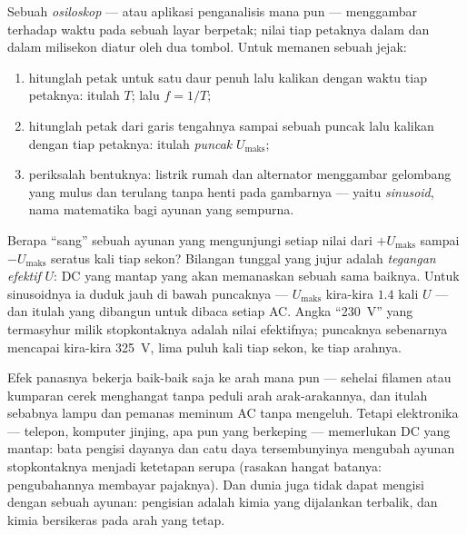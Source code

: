 \begin{method}\label{met:g9:alternating-current:scope}
Sebuah \emph{osiloskop} --- atau aplikasi penganalisis mana
pun --- menggambar  terhadap waktu pada sebuah layar berpetak;
nilai tiap petaknya dalam  dan dalam milisekon diatur oleh dua
tombol. Untuk memanen sebuah jejak:
\begin{enumerate}
  \item hitunglah petak untuk satu daur penuh lalu kalikan dengan
        waktu tiap petaknya: itulah $T$; lalu $f = 1/T$;
  \item hitunglah petak dari garis tengahnya sampai sebuah puncak lalu
        kalikan dengan  tiap petaknya: itulah \emph{
        puncak} $U_{\text{maks}}$;
  \item periksalah bentuknya: listrik rumah dan alternator menggambar
        gelombang yang mulus dan terulang tanpa henti pada gambarnya
        --- yaitu \emph{sinusoid}, nama matematika bagi ayunan yang
        sempurna.
\end{enumerate}
\end{method}

\begin{proposition}\label{prop:g9:alternating-current:effective}
Berapa ``sang''  sebuah ayunan yang mengunjungi setiap nilai
dari $+U_{\text{maks}}$ sampai $-U_{\text{maks}}$ seratus kali tiap
sekon? Bilangan tunggal yang jujur adalah \emph{tegangan
efektif} $U$:  DC yang mantap yang
akan memanaskan sebuah  sama baiknya. Untuk sinusoidnya ia
duduk jauh di bawah puncaknya --- $U_{\text{maks}}$ kira-kira $1.4$
kali $U$ --- dan itulah yang dibangun untuk dibaca setiap 
AC. Angka ``\qty{230}{V}'' yang termasyhur milik stopkontaknya adalah
nilai efektifnya; puncaknya sebenarnya mencapai kira-kira
\qty{325}{V}, lima puluh kali tiap sekon, ke tiap arahnya.
\end{proposition}

\begin{example}\label{ex:g9:alternating-current:whocares}
Efek panasnya bekerja baik-baik saja ke arah mana pun --- sehelai
filamen atau kumparan cerek menghangat tanpa peduli arah
arak-arakannya, dan itulah sebabnya lampu dan pemanas meminum AC tanpa
mengeluh. Tetapi elektronika --- telepon, komputer jinjing, apa pun
yang berkeping --- memerlukan DC yang mantap: bata pengisi dayanya dan
catu daya tersembunyinya mengubah ayunan stopkontaknya menjadi
ketetapan serupa  (rasakan hangat batanya: pengubahannya
membayar pajaknya). Dan dunia  juga tidak dapat mengisi
dengan sebuah ayunan: pengisian adalah kimia yang dijalankan terbalik,
dan kimia bersikeras pada arah yang tetap.
\end{example}


